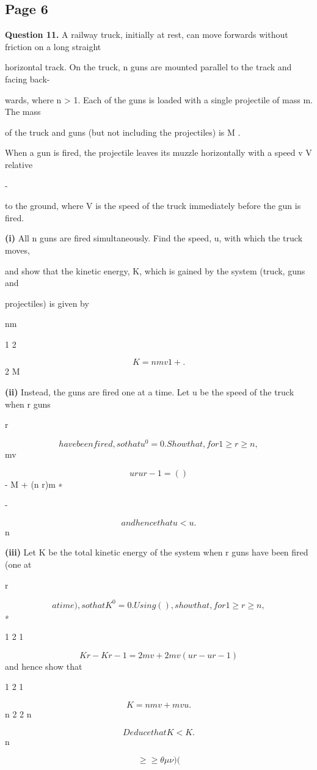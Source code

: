 \documentclass[12pt]{article}
\begin{document}
\subsection*{Page 6}
\begin{flushleft}
\bigskip\textbf{Question 11.} A railway truck, initially at rest, can move forwards without friction on a long straight\par
horizontal track. On the truck, n guns are mounted parallel to the track and facing back-\par
wards, where n > 1. Each of the guns is loaded with a single projectile of mass m. The mass\par
of the truck and guns (but not including the projectiles) is M .\par
When a gun is fired, the projectile leaves its muzzle horizontally with a speed v V relative\par
-\par
to the ground, where V is the speed of the truck immediately before the gun is fired.\par
\textbf{(i)} All n guns are fired simultaneously. Find the speed, u, with which the truck moves,\par
and show that the kinetic energy, K, which is gained by the system (truck, guns and\par
projectiles) is given by\par
nm\par
1 2\par
\[K = nmv 1 + .\]
2 M\par
[ ]\par
\textbf{(ii)} Instead, the guns are fired one at a time. Let u be the speed of the truck when r guns\par
r\par
\[have been fired, so that u^0 = 0. Show that, for 1 \geq r \geq n ,\]
mv\par
\[u r u r-1 = ( )\]
- M + (n r)m ∗\par
-\par
\[and hence that u < u .\]
n\par
\textbf{(iii)} Let K be the total kinetic energy of the system when r guns have been fired (one at\par
r\par
\[a time), so that K^0 = 0. Using ( ), show that, for 1 \geq r \geq n ,\]
∗\par
1 2 1\par
\[K r - K r-1 = 2 mv + 2 mv(u r - u r-1)\]
and hence show that\par
1 2 1\par
\[K = nmv + mvu .\]
n 2 2 n\par
\[Deduce that K < K.\]
n\par
\[\geq\geq\theta\mu\nu) (\]
\end{flushleft}
\end{document}
